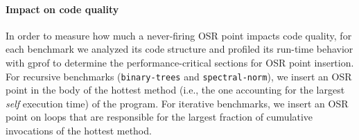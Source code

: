 \paragraph{Impact on code quality}
In order to measure how much a never-firing OSR point impacts code quality, for each benchmark we analyzed its code structure  and profiled its run-time behavior with gprof to determine the performance-critical sections for OSR point insertion.
For recursive benchmarks ({\tt binary-trees} and {\tt spectral-norm}), we insert an OSR point in the body of the hottest method (i.e., the one accounting for the largest {\em self} execution time) of the program. For iterative benchmarks, we insert an OSR point on loops that are responsible for the largest fraction of cumulative invocations of the hottest method.
  
  
  
  
  
  
  
  
  